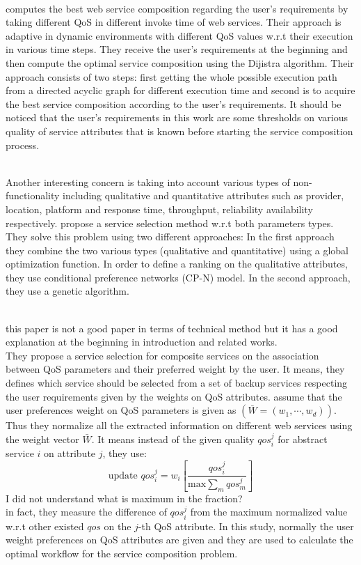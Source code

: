 \documentclass[10pt,journal,compsoc]{IEEEtran}
\begin{document}
\cite{liu2009}\\
\cite{liu2009} computes the best web service composition regarding the user's requirements by taking different QoS in different invoke time of web services. Their approach is adaptive in dynamic environments with different QoS values w.r.t their execution in various time steps. They receive the user's requirements at the beginning and then compute the optimal service composition using the Dijistra algorithm. Their approach consists of two steps: first getting the whole possible execution path from a directed acyclic graph for different execution time and second is to acquire the best service composition according to the user's requirements. It should be noticed that the user's requirements in this work are some thresholds on various quality of service attributes that is known before starting the service composition process. 

 \cite{Wang2017} \\
Another interesting concern is taking into account various types of non-functionality including qualitative and quantitative attributes such as provider, location, platform and response time, throughput, reliability availability respectively. \cite{Wang2017} propose a service selection method w.r.t both parameters types. They solve this problem using two different approaches: In the first approach they combine the two various types (qualitative and quantitative) using a global optimization function. In order to define a ranking on the qualitative attributes, they use conditional preference networks (CP-N) model. In the second approach, they use a genetic algorithm. 

\cite{ARASI2017}\\
{\color{red} this paper is not a good paper in terms of technical method but it has a good explanation at the beginning in introduction and related works.} \\
They propose a service selection for composite services on the association between QoS parameters and their preferred weight by the user. It means, they defines which service should be selected from a set of backup services respecting the user requirements given by the weights on QoS attributes. \cite{ARASI2017} assume that the user preferences weight on QoS parameters is given as $(\bar{W} = (w_1, \cdots, w_d))$. Thus they normalize all the extracted information on different web services using the weight vector $\bar{W}$. It means instead of the given quality $qos_i^j$ for abstract service $i$ on attribute $j$, they use:
\begin{equation}
\text{update } qos_i^j =  w_i \left[ \frac{qos_i^j}{\text{max} \sum_m qos_m^j} \right]
\end{equation}
{\color{red}I did not understand what is maximum in the fraction?}\\
in fact, they measure the difference of $qos_i^j$ from the maximum normalized value w.r.t other existed $qos$ on the $j$-th QoS attribute. In this study, normally the user weight preferences on QoS attributes are given and they are used to calculate the optimal workflow for the service composition problem.
\end{document}
